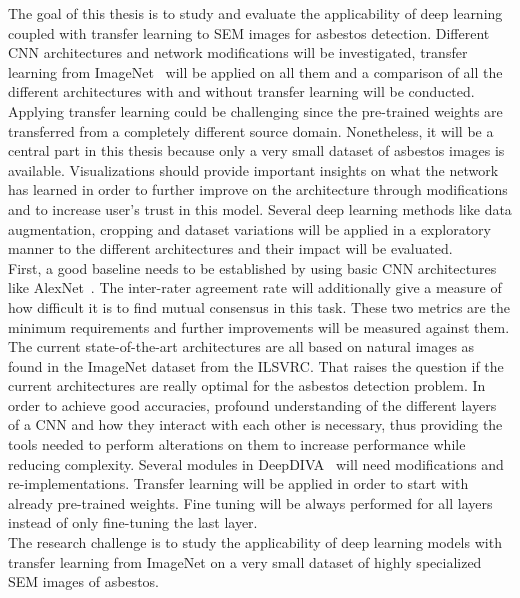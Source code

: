 The goal of this thesis is to study and evaluate the applicability of deep learning coupled with transfer learning to SEM images for asbestos detection. Different CNN architectures and network modifications will be investigated, transfer learning from ImageNet~\cite{imagenet} will be applied on all them and a comparison of all the different architectures with and without transfer learning will be conducted. Applying transfer learning could be challenging since the pre-trained weights are transferred from a completely different source domain. Nonetheless, it will be a central part in this thesis because only a very small dataset of asbestos images is available. Visualizations should provide important insights on what the network has learned in order to further improve on the architecture through modifications and to increase user's trust in this model. Several deep learning methods like data augmentation, cropping and dataset variations will be applied in a exploratory manner to the different architectures and their impact will be evaluated. \\

First, a good baseline needs to be established by using basic CNN architectures like AlexNet~\cite{krizhevsky2012imagenet}. The inter-rater agreement rate will additionally give a measure of how difficult it is to find mutual consensus in this task. These two metrics are the minimum requirements and further improvements will be measured against them. The current state-of-the-art architectures are all based on natural images as found in the ImageNet dataset from the ILSVRC. That raises the question if the current architectures are really optimal for the asbestos detection problem. In order to achieve good accuracies, profound understanding of the different layers of a CNN and how they interact with each other is necessary, thus providing the tools needed to perform alterations on them to increase performance while reducing complexity. Several modules in DeepDIVA~\cite{deepdiva} will need modifications and re-implementations. Transfer learning will be applied in order to start with already pre-trained weights. Fine tuning will be always performed for all layers instead of only fine-tuning the last layer.\\

The research challenge is to study the applicability of deep learning models with transfer learning from ImageNet on a very small dataset of highly specialized SEM images of asbestos.\\

